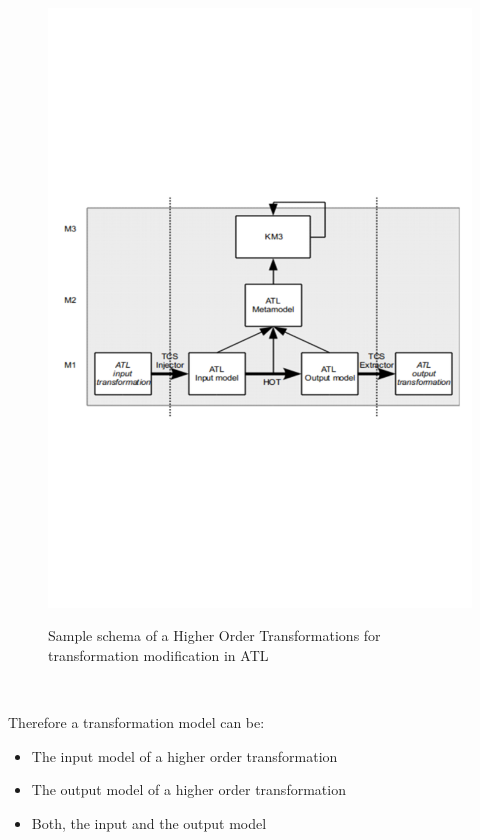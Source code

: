 \documentclass{llncs}
\begin{document}
 \begin{figure}
	\centering
	\includegraphics[width=1\textwidth,natwidth=610,natheight=642]{figures/HOT.pdf}
	\caption{Sample schema of a Higher Order Transformations for transformation modification in
	ATL}\cite{misc:ModelingLanguages}
	\label{fig:samplefigure_pdf}
\end{figure}~\cite{misc:ModelingLanguages}

Therefore a transformation model can be:

\begin{itemize}
	\item The input model of a higher order transformation
	\item The output model of a higher order transformation
	\item Both, the input and the output model
\end{itemize}
\end{document}
